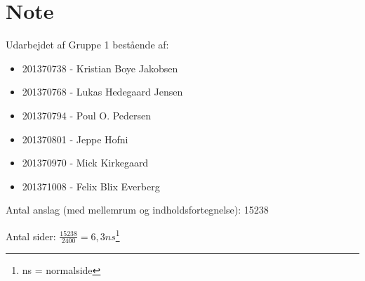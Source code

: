 \chapter{Note}

Udarbejdet af Gruppe 1 bestående af:

\begin{itemize}
\item 201370738 - Kristian Boye Jakobsen
\item 201370768 - Lukas Hedegaard Jensen
\item 201370794 - Poul O. Pedersen
\item 201370801 - Jeppe Hofni
\item 201370970 - Mick Kirkegaard
\item 201371008 - Felix Blix Everberg
\end{itemize}

Antal anslag (med mellemrum og indholdsfortegnelse): 15238

Antal sider: $\frac { 15238 }{ 2400 } = 6,3ns$\footnote{ns = normalside}
